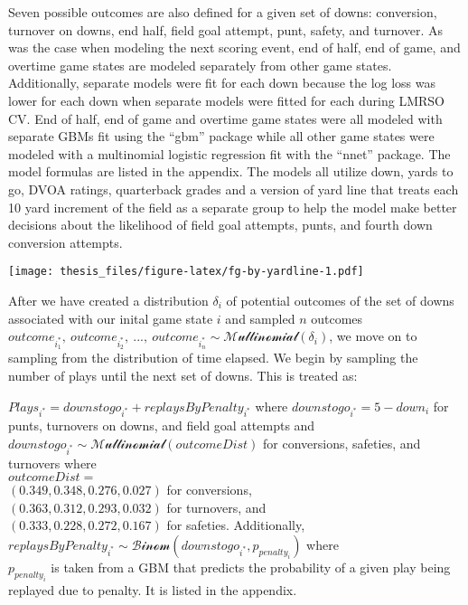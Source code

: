 \documentclass[12pt,twoside]{dukestatscithesis}
\begin{document}
Seven possible outcomes are also defined for a given set of downs: conversion, turnover on downs, end half, field goal attempt, punt, safety, and turnover. As was the case when modeling the next scoring event, end of half, end of game, and overtime game states are modeled separately from other game states. Additionally, separate models were fit for each down because the log loss was lower for each down when separate models were fitted for each during LMRSO CV. End of half, end of game and overtime game states were all modeled with separate GBMs fit using the ``gbm'' package while all other game states were modeled with a multinomial logistic regression fit with the ``nnet'' package. The model formulas are listed in the appendix. The models all utilize down, yards to go, DVOA ratings, quarterback grades and a version of yard line that treats each 10 yard increment of the field as a separate group to help the model make better decisions about the likelihood of field goal attempts, punts, and fourth down conversion attempts.

\texttt{[image: thesis\_files/figure-latex/fg-by-yardline-1.pdf]}

After we have created a distribution \(\delta_i\) of potential outcomes of the set of downs associated with our inital game state \(i\) and sampled \(n\) outcomes \(outcome_{i^*_1}, \: outcome_{i^*_2}, \:..., \:outcome_{i^*_n} \sim \mathcal{Multinomial}(\delta_i)\), we move on to sampling from the distribution of time elapsed. We begin by sampling the number of plays until the next set of downs. This is treated as:

\(Plays_{i^*} = downstogo_{i^*} + replaysByPenalty_{i^*}\) where
\(downstogo_{i^*} = 5 - down_i\) for punts, turnovers on downs, and field goal attempts and\\
\(downstogo_{i^*} \sim \mathcal{Multinomial}(outcomeDist)\) for conversions, safeties, and turnovers where\\
\(outcomeDist =\)\\
\((0.349, 0.348, 0.276, 0.027)\) for conversions,\\
\((0.363, 0.312, 0.293, 0.032)\) for turnovers, and\\
\((0.333, 0.228, 0.272, 0.167)\) for safeties. Additionally,\\
\(replaysByPenalty_{i^*} \sim \mathcal{Binom}(downstogo_{i^*}, p_{penalty_i})\) where\\
\(p_{penalty_i}\) is taken from a GBM that predicts the probability of a given play being replayed due to penalty. It is listed in the appendix.
\end{document}
